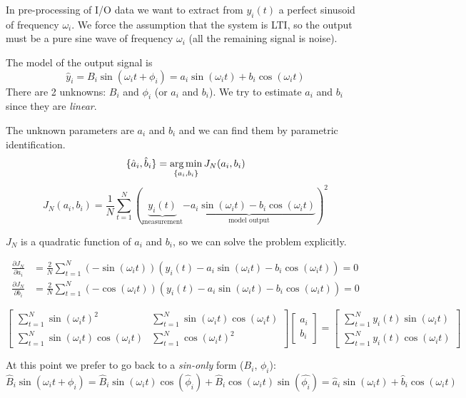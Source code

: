 In pre-processing of I/O data we want to extract from $y_i(t)$ a perfect sinusoid of frequency $\omega_i$.
We force the assumption that the system is LTI, so the output must be a pure sine wave of frequency $\omega_i$ (all the remaining signal is noise).

The model of the output signal is
\[ \hat{y}_i = B_i \sin(\omega_it+\phi_i) = a_i\sin(\omega_it) + b_i\cos(\omega_it) \]
There are 2 unknowns: $B_i$ and $\phi_i$ (or $a_i$ and $b_i$).
We try to estimate $a_i$ and $b_i$ since they are \emph{linear}.

The unknown parameters are $a_i$ and $b_i$ and we can find them by parametric identification.
\[ \{ \hat{a}_i, \hat{b}_i \} = \operatorname*{arg\,min}_{\{a_i, b_i\}} J_N(a_i, b_i) \]
\[ J_N(a_i, b_i) = \frac{1}{N} \sum_{t=1}^N ( \underbrace{y_i(t)}_{\text{measurement}} \underbrace{- a_i\sin(\omega_it) - b_i\cos(\omega_it)}_\text{model output})^2 \]

$J_N$ is a quadratic function of $a_i$ and $b_i$, so we can solve the problem explicitly.

\begin{align*}
    \frac{\partial J_N}{\partial a_i} &= \frac{2}{N} \sum_{t=1}^N (-\sin(\omega_it))(y_i(t) - a_i\sin(\omega_it)-b_i\cos(\omega_it)) = 0 \\
    \frac{\partial J_N}{\partial b_i} &= \frac{2}{N} \sum_{t=1}^N (-\cos(\omega_it))(y_i(t) - a_i\sin(\omega_it)-b_i\cos(\omega_it)) = 0
\end{align*}

\[
    \begin{bmatrix}
        \sum_{t=1}^N \sin(\omega_it)^2 & \sum_{t=1}^N \sin(\omega_it)\cos(\omega_it) \\
        \sum_{t=1}^N \sin(\omega_it)\cos(\omega_it) & \sum_{t=1}^N \cos(\omega_it)^2
    \end{bmatrix}
    \begin{bmatrix}
        a_i \\ b_i
    \end{bmatrix} =
    \begin{bmatrix}
        \sum_{t=1}^N y_i(t)\sin(\omega_it) \\
        \sum_{t=1}^N y_i(t)\cos(\omega_it)
    \end{bmatrix}
\]

At this point we prefer to go back to a \emph{sin-only} form ($B_i$, $\phi_i$):
\[
    \hat{B}_i\sin(\omega_it + \phi_i) = \hat{B}_i\sin(\omega_it)\cos(\hat{\phi}_i) + \hat{B}_i\cos(\omega_it)\sin(\hat{\phi_i}) = \hat{a}_i\sin(\omega_it) + \hat{b}_i\cos(\omega_it)
\]

